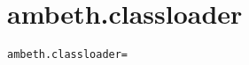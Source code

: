 \section{ambeth.classloader}
\label{configuration:AmbethClassloader}
\ClearAPI
\TODO%
\begin{lstlisting}[style=Props,caption={Usage example for \textit{ambeth.classloader}}]
ambeth.classloader=
\end{lstlisting}